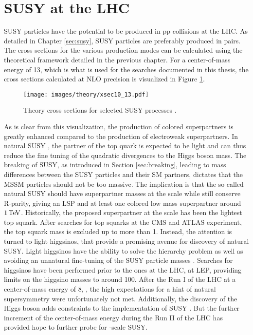 \section{SUSY at the LHC}
\noindent\justify
SUSY particles have the potential to be produced in pp collisions at the LHC. 
As detailed in Chapter \ref{sec:susy}, SUSY particles are preferably produced in pairs. 
The cross sections for the various production modes can be calculated using the theoretical framework detailed in the previous chapter. 
For a center-of-mass energy of 13\TeV, which is what is used for the searches documented in this thesis, the cross sections calculated at NLO precision is visualized in Figure \ref{fig:xsecs}. 
\begin{figure}[htbp!]
\begin{center}
    \texttt{[image: images/theory/xsec10\_13.pdf]}
    \caption{Theory cross sections for selected SUSY processes \cite{Borschensky:2014cia}.}
\label{fig:xsecs}
\end{center}
\end{figure}
As is clear from this visualization, the production of colored superpartners is greatly enhanced compared to the production of electroweak superpartners. 
In natural SUSY \cite{Dimopoulos:1995mi,Barbieri:2009ev,Papucci:2011wy}, the partner of the top quark is expected to be light and can thus reduce the fine tuning of the quadratic divergences to the Higgs boson mass.
The breaking of SUSY, as introduced in Section \ref{sec:breaking}, leading to mass differences between the SUSY particles and their SM partners, dictates that the MSSM particles should not be too massive. 
The implication is that the so called natural SUSY should have superpartner masses at the \TeV scale while still conserve R-parity, giving an LSP and at least one colored low mass superpartner around $1\,\text{Te\hspace{-.08em}V}$. 
Historically, the proposed superpartner at the \TeV scale has been the lightest top squark. 
After searches for top squarks at the CMS and ATLAS experiment, the top squark mass is excluded up to more than 1\TeV \cite{Sirunyan:2017wif}. 
Instead, the attention is turned to light higgsinos, that provide a promising avenue for discovery of natural SUSY. 
Light higgsinos have the ability to solve the hierarchy problem as well as avoiding an unnatural fine-tuning of the SUSY particle masses \cite{Han:2014kaa,Giudice:2010wb}. 
Searches for higgsinos have been performed prior to the ones at the LHC, at LEP, providing limits on the higgsino masses to around 100\GeV. 
After the Run I of the LHC at a center-of-mass energy of 8\TeV, \cite{Kraml:2012er,Autermann:2016les}, the high expectations for a hint of natural supersymmetry were unfortunately not met. 
Additionally, the discovery of the Higgs boson adds constraints to the implementation of SUSY \cite{Arbey:2011ab}. 
But the further increment of the center-of-mass energy during the Run II of the LHC has provided hope to further probe for \TeV-scale SUSY.
